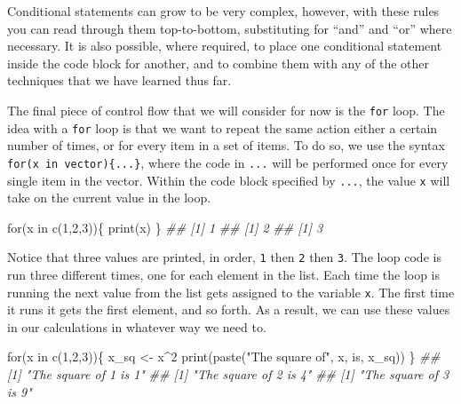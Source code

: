 \documentclass[
  letterpaper,
  DIV=11,
  numbers=noendperiod]{scrreprt}
\newenvironment{Shaded}{\begin{snugshade}}{\end{snugshade}}
\newcommand{\ControlFlowTok}[1]{\textcolor[rgb]{0.00,0.23,0.31}{#1}}
\newcommand{\DecValTok}[1]{\textcolor[rgb]{0.68,0.00,0.00}{#1}}
\newcommand{\DocumentationTok}[1]{\textcolor[rgb]{0.37,0.37,0.37}{\textit{#1}}}
\newcommand{\FunctionTok}[1]{\textcolor[rgb]{0.28,0.35,0.67}{#1}}
\newcommand{\NormalTok}[1]{\textcolor[rgb]{0.00,0.23,0.31}{#1}}
\newcommand{\OtherTok}[1]{\textcolor[rgb]{0.00,0.23,0.31}{#1}}
\newcommand{\SpecialCharTok}[1]{\textcolor[rgb]{0.37,0.37,0.37}{#1}}
\newcommand{\StringTok}[1]{\textcolor[rgb]{0.13,0.47,0.30}{#1}}
\theoremstyle{definition}
\theoremstyle{definition}
\theoremstyle{definition}
\theoremstyle{remark}
\begin{document}
Conditional statements can grow to be very complex, however, with these
rules you can read through them top-to-bottom, substituting for ``and''
and ``or'' where necessary. It is also possible, where required, to
place one conditional statement inside the code block for another, and
to combine them with any of the other techniques that we have learned
thus far.

The final piece of control flow that we will consider for now is the
\texttt{for} loop. The idea with a \texttt{for} loop is that we want to
repeat the same action either a certain number of times, or for every
item in a set of items. To do so, we use the syntax
\texttt{for(x\ in\ vector)\{...\}}, where the code in \texttt{...} will
be performed once for every single item in the vector. Within the code
block specified by \texttt{...}, the value \texttt{x} will take on the
current value in the loop.

\begin{Shaded}
\begin{Highlighting}[]
\ControlFlowTok{for}\NormalTok{(x }\ControlFlowTok{in} \FunctionTok{c}\NormalTok{(}\DecValTok{1}\NormalTok{,}\DecValTok{2}\NormalTok{,}\DecValTok{3}\NormalTok{))\{}
    \FunctionTok{print}\NormalTok{(x)}
\NormalTok{\}}
\DocumentationTok{\#\# [1] 1}
\DocumentationTok{\#\# [1] 2}
\DocumentationTok{\#\# [1] 3}
\end{Highlighting}
\end{Shaded}

Notice that three values are printed, in order, \texttt{1} then
\texttt{2} then \texttt{3}. The loop code is run three different times,
one for each element in the list. Each time the loop is running the next
value from the list gets assigned to the variable \texttt{x}. The first
time it runs it gets the first element, and so forth. As a result, we
can use these values in our calculations in whatever way we need to.

\begin{Shaded}
\begin{Highlighting}[]
\ControlFlowTok{for}\NormalTok{(x }\ControlFlowTok{in} \FunctionTok{c}\NormalTok{(}\DecValTok{1}\NormalTok{,}\DecValTok{2}\NormalTok{,}\DecValTok{3}\NormalTok{))\{}
\NormalTok{    x\_sq }\OtherTok{\textless{}{-}}\NormalTok{ x}\SpecialCharTok{\^{}}\DecValTok{2}
    \FunctionTok{print}\NormalTok{(}\FunctionTok{paste}\NormalTok{(}\StringTok{"The square of"}\NormalTok{, x, }\StringTok{\textquotesingle{}is\textquotesingle{}}\NormalTok{, x\_sq))}
\NormalTok{\}}
\DocumentationTok{\#\# [1] "The square of 1 is 1"}
\DocumentationTok{\#\# [1] "The square of 2 is 4"}
\DocumentationTok{\#\# [1] "The square of 3 is 9"}
\end{Highlighting}
\end{Shaded}
\end{document}
